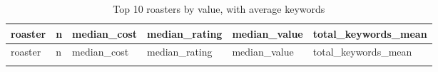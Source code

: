 \documentclass[11pt,preprint]{elsarticle}
\numberwithin{equation}{section}
\numberwithin{figure}{section}
\numberwithin{table}{section}
\begin{document}
\begin{longtable}[]{@{}
  >{\raggedright\arraybackslash}p{}
  >{\raggedleft\arraybackslash}p{}
  >{\raggedleft\arraybackslash}p{}
  >{\raggedleft\arraybackslash}p{}
  >{\raggedleft\arraybackslash}p{}
  >{\raggedleft\arraybackslash}p{}@{}}
\caption{Top 10 roasters by value, with average keywords}\tabularnewline
\toprule\noalign{}
\begin{minipage}[b]{\linewidth}\raggedright
roaster
\end{minipage} & \begin{minipage}[b]{\linewidth}\raggedleft
n
\end{minipage} & \begin{minipage}[b]{\linewidth}\raggedleft
median\_cost
\end{minipage} & \begin{minipage}[b]{\linewidth}\raggedleft
median\_rating
\end{minipage} & \begin{minipage}[b]{\linewidth}\raggedleft
median\_value
\end{minipage} & \begin{minipage}[b]{\linewidth}\raggedleft
total\_keywords\_mean
\end{minipage} \\
\midrule\noalign{}
\endfirsthead
\toprule\noalign{}
\begin{minipage}[b]{\linewidth}\raggedright
roaster
\end{minipage} & \begin{minipage}[b]{\linewidth}\raggedleft
n
\end{minipage} & \begin{minipage}[b]{\linewidth}\raggedleft
median\_cost
\end{minipage} & \begin{minipage}[b]{\linewidth}\raggedleft
median\_rating
\end{minipage} & \begin{minipage}[b]{\linewidth}\raggedleft
median\_value
\end{minipage} & \begin{minipage}[b]{\linewidth}\raggedleft
total\_keywords\_mean
\end{minipage} \\
\midrule\noalign{}

\end{longtable}
\end{document}
